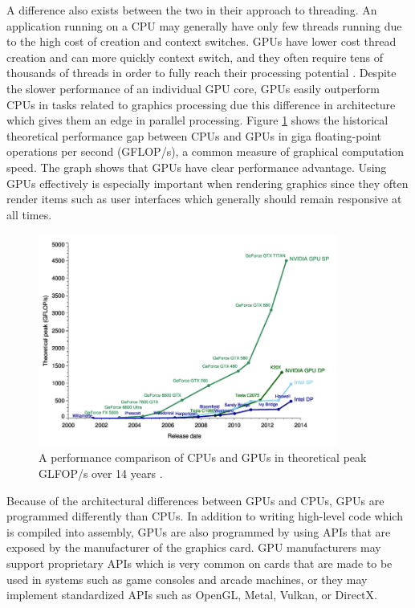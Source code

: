 \documentclass{article}
\begin{document}
A difference also exists between the two in their approach to threading. An application running on a CPU may generally have only few threads running due to the high cost of creation and context switches. GPUs have lower cost thread creation and can more quickly context switch, and they often require tens of thousands of threads in order to fully reach their processing potential \cite{larkin2016}. Despite the slower performance of an individual GPU core, GPUs easily outperform CPUs in tasks related to graphics processing due this difference in architecture which gives them an edge in parallel processing. Figure \ref{fig:performance} shows the historical theoretical performance gap between CPUs and GPUs in giga floating-point operations per second (GFLOP/s), a common measure of graphical computation speed. The graph shows that GPUs have clear performance advantage. Using GPUs effectively is especially important when rendering graphics since they often render items such as user interfaces which generally should remain responsive at all times.

\begin{figure}[h]
	\centering
	\includegraphics[height=7cm]{cpu-vs-gpu}
	\caption{A performance comparison of CPUs and GPUs in theoretical peak GLFOP/s over 14 years \cite{galloy2013}.}
	\label{fig:performance}
\end{figure}

Because of the architectural differences between GPUs and CPUs, GPUs are programmed differently than CPUs. In addition to writing high-level code which is compiled into assembly, GPUs are also programmed by using APIs that are exposed by the manufacturer of the graphics card. GPU manufacturers may support proprietary APIs which is very common on cards that are made to be used in systems such as game consoles and arcade machines, or they may implement standardized APIs such as OpenGL, Metal, Vulkan, or DirectX.
\end{document}
